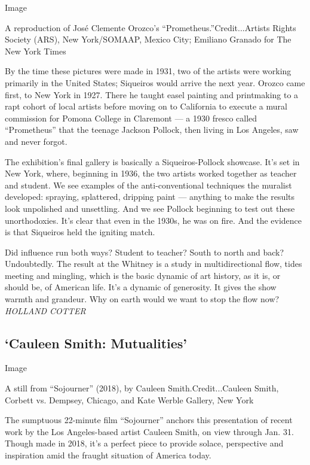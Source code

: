 Image

A reproduction of José Clemente Orozco's ``Prometheus.''Credit...Artists
Rights Society (ARS), New York/SOMAAP, Mexico City; Emiliano Granado for
The New York Times

By the time these pictures were made in 1931, two of the artists were
working primarily in the United States; Siqueiros would arrive the next
year. Orozco came first, to New York in 1927. There he taught easel
painting and printmaking to a rapt cohort of local artists before moving
on to California to execute a mural commission for Pomona College in
Claremont --- a 1930 fresco called ``Prometheus'' that the teenage
Jackson Pollock, then living in Los Angeles, saw and never forgot.

The exhibition's final gallery is basically a Siqueiros-Pollock
showcase. It's set in New York, where, beginning in 1936, the two
artists worked together as teacher and student. We see examples of the
anti-conventional techniques the muralist developed: spraying,
splattered, dripping paint --- anything to make the results look
unpolished and unsettling. And we see Pollock beginning to test out
these unorthodoxies. It's clear that even in the 1930s, he was on fire.
And the evidence is that Siqueiros held the igniting match.

Did influence run both ways? Student to teacher? South to north and
back? Undoubtedly. The result at the Whitney is a study in
multidirectional flow, tides meeting and mingling, which is the basic
dynamic of art history, as it is, or should be, of American life. It's a
dynamic of generosity. It gives the show warmth and grandeur. Why on
earth would we want to stop the flow now? \emph{HOLLAND COTTER}

\hypertarget{cauleen-smith-mutualities}{%
\subsection{`Cauleen Smith:
Mutualities'}\label{cauleen-smith-mutualities}}

Image

A still from ``Sojourner'' (2018), by Cauleen Smith.Credit...Cauleen
Smith, Corbett vs. Dempsey, Chicago, and Kate Werble Gallery, New York

The sumptuous 22-minute film ``Sojourner'' anchors this presentation of
recent work by the Los Angeles-based artist Cauleen Smith, on view
through Jan. 31. Though made in 2018, it's a perfect piece to provide
solace, perspective and inspiration amid the fraught situation of
America today.

